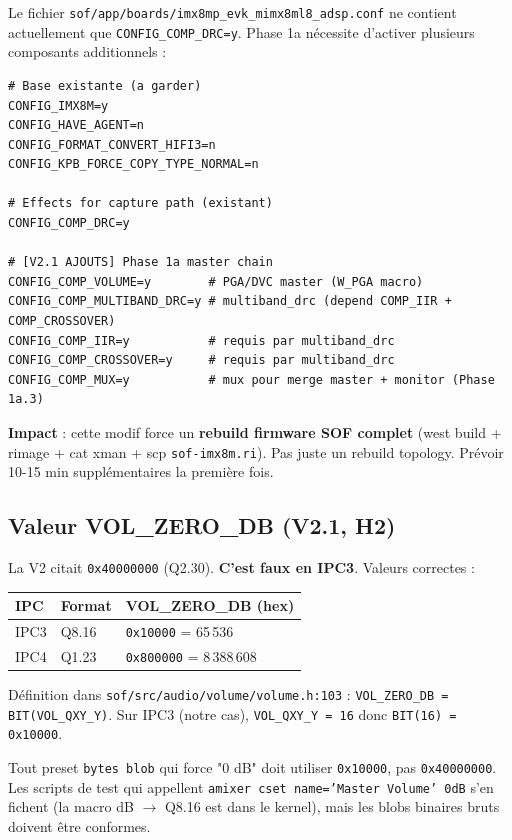 \documentclass[11pt,a4paper]{article}
\begin{document}
Le fichier \texttt{sof/app/boards/imx8mp\_evk\_mimx8ml8\_adsp.conf} ne contient actuellement que \texttt{CONFIG\_COMP\_DRC=y}. Phase 1a nécessite d'activer plusieurs composants additionnels :

\begin{lstlisting}[language={}, basicstyle=\ttfamily\scriptsize]
# Base existante (a garder)
CONFIG_IMX8M=y
CONFIG_HAVE_AGENT=n
CONFIG_FORMAT_CONVERT_HIFI3=n
CONFIG_KPB_FORCE_COPY_TYPE_NORMAL=n

# Effects for capture path (existant)
CONFIG_COMP_DRC=y

# [V2.1 AJOUTS] Phase 1a master chain
CONFIG_COMP_VOLUME=y        # PGA/DVC master (W_PGA macro)
CONFIG_COMP_MULTIBAND_DRC=y # multiband_drc (depend COMP_IIR + COMP_CROSSOVER)
CONFIG_COMP_IIR=y           # requis par multiband_drc
CONFIG_COMP_CROSSOVER=y     # requis par multiband_drc
CONFIG_COMP_MUX=y           # mux pour merge master + monitor (Phase 1a.3)
\end{lstlisting}

\textbf{Impact} : cette modif force un \textbf{rebuild firmware SOF complet} (west build + rimage + cat xman + scp \texttt{sof-imx8m.ri}). Pas juste un rebuild topology. Prévoir 10-15 min supplémentaires la première fois.

\subsection{Valeur VOL\_ZERO\_DB (V2.1, H2)}

La V2 citait \texttt{0x40000000} (Q2.30). \textbf{C'est faux en IPC3}. Valeurs correctes :

\begin{center}
\begin{tabular}{lll}
\toprule
\textbf{IPC} & \textbf{Format} & \textbf{VOL\_ZERO\_DB (hex)} \\
\midrule
IPC3 & Q8.16 & \texttt{0x10000} = 65\,536 \\
IPC4 & Q1.23 & \texttt{0x800000} = 8\,388\,608 \\
\bottomrule
\end{tabular}
\end{center}

Définition dans \texttt{sof/src/audio/volume/volume.h:103} : \texttt{VOL\_ZERO\_DB = BIT(VOL\_QXY\_Y)}. Sur IPC3 (notre cas), \texttt{VOL\_QXY\_Y = 16} donc \texttt{BIT(16) = 0x10000}.

Tout preset \texttt{bytes blob} qui force "0 dB" doit utiliser \texttt{0x10000}, pas \texttt{0x40000000}. Les scripts de test qui appellent \texttt{amixer cset name='Master Volume' 0dB} s'en fichent (la macro dB $\rightarrow$ Q8.16 est dans le kernel), mais les blobs binaires bruts doivent être conformes.
\end{document}
